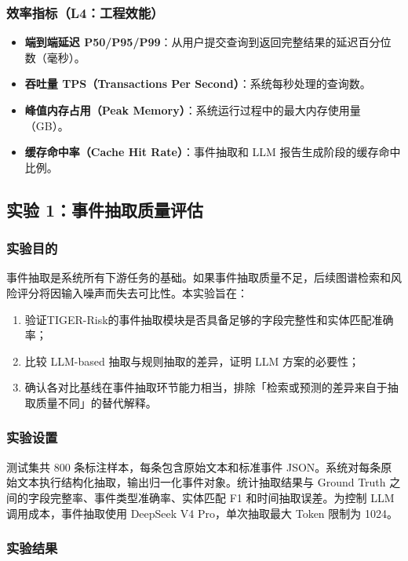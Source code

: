 \documentclass[12pt,a4paper]{article}
\newcommand{\projectshort}{TIGER-Risk}
\newcommand{\term}[1]{\textbf{#1}}
\begin{document}
\subsubsection{效率指标（L4：工程效能）}

\begin{itemize}
    \item \term{端到端延迟 P50/P95/P99}：从用户提交查询到返回完整结果的延迟百分位数（毫秒）。
    \item \term{吞吐量 TPS（Transactions Per Second）}：系统每秒处理的查询数。
    \item \term{峰值内存占用（Peak Memory）}：系统运行过程中的最大内存使用量（GB）。
    \item \term{缓存命中率（Cache Hit Rate）}：事件抽取和 LLM 报告生成阶段的缓存命中比例。
\end{itemize}

\subsection{实验 1：事件抽取质量评估}
\label{sec:exp-extraction}

\subsubsection{实验目的}

事件抽取是系统所有下游任务的基础。如果事件抽取质量不足，后续图谱检索和风险评分将因输入噪声而失去可比性。本实验旨在：
\begin{enumerate}
    \item 验证\projectshort 的事件抽取模块是否具备足够的字段完整性和实体匹配准确率；
    \item 比较 LLM-based 抽取与规则抽取的差异，证明 LLM 方案的必要性；
    \item 确认各对比基线在事件抽取环节能力相当，排除「检索或预测的差异来自于抽取质量不同」的替代解释。
\end{enumerate}

\subsubsection{实验设置}

测试集共 800 条标注样本，每条包含原始文本和标准事件 JSON。系统对每条原始文本执行结构化抽取，输出归一化事件对象。统计抽取结果与 Ground Truth 之间的字段完整率、事件类型准确率、实体匹配 F1 和时间抽取误差。为控制 LLM 调用成本，事件抽取使用 DeepSeek V4 Pro，单次抽取最大 Token 限制为 1024。

\subsubsection{实验结果}
\end{document}
